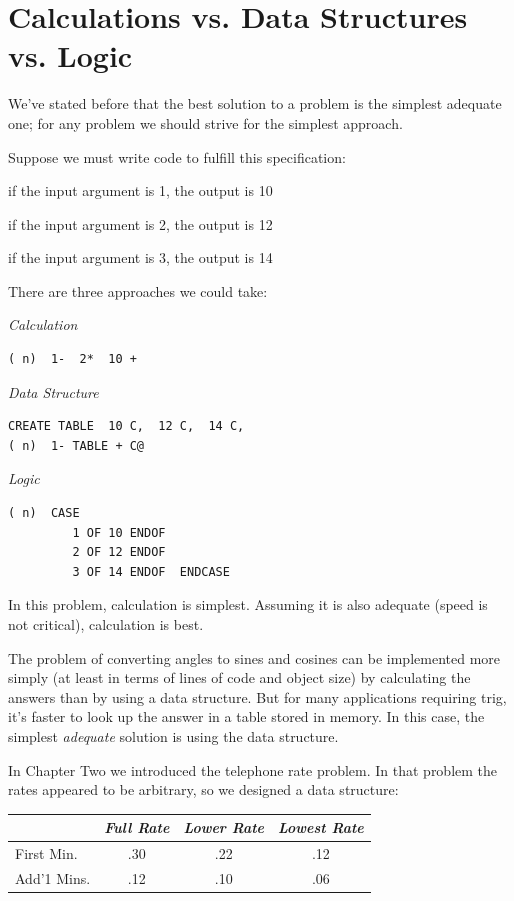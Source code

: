 \section{Calculations vs. Data Structures vs. Logic}

We've stated before that the best solution to a problem is the simplest
adequate one; for any problem we should strive for the simplest
approach.

Suppose we must write code to fulfill this specification:

\medskip
{\sf if the input argument is 1, the output is 10}

{\sf if the input argument is 2, the output is 12}

{\sf if the input argument is 3, the output is 14}

\medskip

There are three approaches we could take:

\emph{Calculation}

\begin{verbatim}
( n)  1-  2*  10 +
\end{verbatim}

\emph{Data Structure}

\begin{verbatim}
CREATE TABLE  10 C,  12 C,  14 C,
( n)  1- TABLE + C@
\end{verbatim}

\emph{Logic}

\begin{verbatim}
( n)  CASE
         1 OF 10 ENDOF
         2 OF 12 ENDOF
         3 OF 14 ENDOF  ENDCASE
\end{verbatim}
In this problem, calculation is simplest. Assuming it is also adequate
(speed is not critical), calculation is best.

The problem of converting angles to sines and cosines can be implemented
more simply (at least in terms of lines of code and object size)
by calculating the answers than by using a data structure. But for many
applications requiring trig, it's faster to look up the answer in a table
stored in memory. In this case, the simplest \emph{adequate} solution is using
the data structure.

In Chapter Two we introduced the telephone rate problem. In that
problem the rates appeared to be arbitrary, so we designed a data
structure:

\bigskip
\begin{tabular}{lccc}
          & \emph{Full Rate} & \emph{Lower Rate} & \emph{Lowest Rate} \\ \hline
First Min.  &       .30        &        .22        &          .12 \\ \hline
Add'1 Mins. &       .12        &        .10        &          .06 \\ \hline
\end{tabular}
\bigskip

